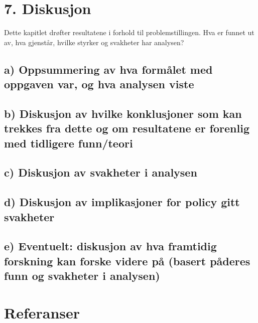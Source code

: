 \documentclass[
  12pt,
  a4paper,
  DIV=11,
  numbers=noendperiod]{scrartcl}
\begin{document}
\section{7. Diskusjon}\label{diskusjon}

Dette kapitlet drøfter resultatene i forhold til problemstillingen. Hva
er funnet ut av, hva gjenstår, hvilke styrker og svakheter har analysen?

\subsection{a) Oppsummering av hva formålet med oppgaven var, og hva
analysen
viste}\label{a-oppsummering-av-hva-formuxe5let-med-oppgaven-var-og-hva-analysen-viste}

\subsection{b) Diskusjon av hvilke konklusjoner som kan trekkes fra
dette og om resultatene er forenlig med tidligere
funn/teori}\label{b-diskusjon-av-hvilke-konklusjoner-som-kan-trekkes-fra-dette-og-om-resultatene-er-forenlig-med-tidligere-funnteori}

\subsection{c) Diskusjon av svakheter i
analysen}\label{c-diskusjon-av-svakheter-i-analysen}

\subsection{d) Diskusjon av implikasjoner for policy gitt
svakheter}\label{d-diskusjon-av-implikasjoner-for-policy-gitt-svakheter}

\subsection{e) Eventuelt: diskusjon av hva framtidig forskning kan
forske videre på (basert påderes funn og svakheter i
analysen)}\label{e-eventuelt-diskusjon-av-hva-framtidig-forskning-kan-forske-videre-puxe5-basert-puxe5deres-funn-og-svakheter-i-analysen}

\clearpage

\section{Referanser}\label{referanser}
\end{document}
